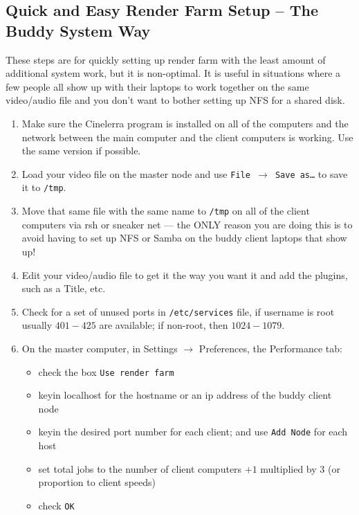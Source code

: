 \subsection{Quick and Easy Render Farm Setup – The Buddy System Way}%
\label{sub:buddy_system_way}

These steps are for quickly setting up render farm with the least amount of additional system work, but it is non-optimal.  It is useful in situations where a few people all show up with their laptops to work together on the same video/audio file and you don’t want to bother setting up NFS for a shared disk.

\begin{enumerate}
    \item Make sure the Cinelerra program is installed on all of the computers and the network between the
    main computer and the client computers is working.  Use the same version if possible.
    \item Load your video file on the master node and use \texttt{File $\rightarrow$ Save as\dots}  to save it to \texttt{/tmp}.
    \item Move that same file with the same name to \texttt{/tmp} on all of the client computers via rsh or sneaker net --- the ONLY reason you are doing this is to avoid having to set up NFS or Samba on the buddy client
    laptops that show up!
    \item Edit your video/audio file to get it the way you want it and add the plugins, such as a Title, etc.
    \item Check for a set of unused ports in \texttt{/etc/services} file, if username is root usually $401-425$ are
    available; if non-root, then $1024-1079$.
    \item On the master computer, in Settings $\rightarrow$ Preferences, the Performance tab:
    \begin{itemize}
        \item check the box \texttt{Use render farm}
        \item keyin localhost for the hostname or an ip address of the buddy client node
        \item keyin the desired port number for each client; and use \texttt{Add Node} for each host
        \item set total jobs to the number of client computers $+1$ multiplied by $3$ (or proportion to client speeds)
        \item check \texttt{OK}
    \end{itemize}

\end{enumerate}
